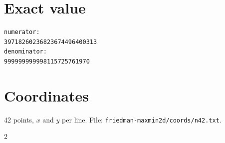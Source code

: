 \documentclass[11pt,a4paper]{article}
\begin{document}
\appendix
\section{Exact value}
{\small
\begin{verbatim}
numerator:
39718260236823674496400313
denominator:
999999999998115725761970
\end{verbatim}}

\section{Coordinates}
42 points, $x$ and $y$ per line. File: \texttt{friedman-maxmin2d/coords/n42.txt}.
{\tiny
\begin{multicols}{2}
\end{multicols}}
\end{document}

